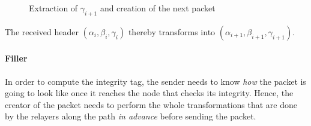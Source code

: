 \begin{figure}[H]
    \caption{Extraction of $\gamma_{i+1}$ and creation of the next packet}
\end{figure}

The received header $(\alpha_i,\beta_i,\gamma_i)$ thereby transforms into $(\alpha_{i+1},\beta_{i+1},\gamma_{i+1})$.

\paragraph{Filler}

In order to compute the integrity tag, the sender needs to know \textit{how} the packet is going to look like once it reaches the node that checks its integrity. Hence, the creator of the packet needs to perform the whole transformations that are done by the relayers along the path \textit{in advance} before sending the packet.

